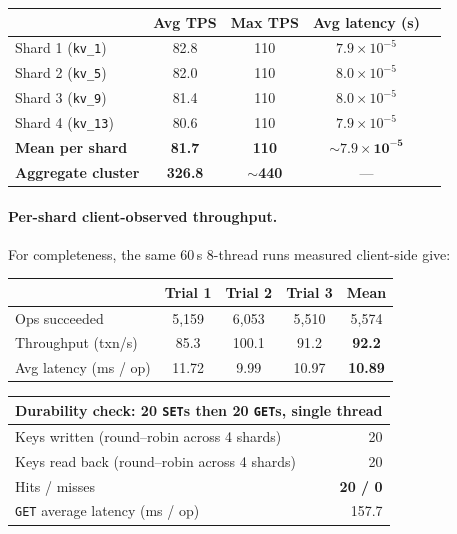 \documentclass[11pt]{article}
\begin{document}
\begin{tabular}{lcccc}
  \toprule
  & \textbf{Avg TPS} & \textbf{Max TPS} & \textbf{Avg latency (s)} \\
  \midrule
  Shard 1 (\texttt{kv\_1})  & 82.8 & 110 & $7.9 \times 10^{-5}$ \\
  Shard 2 (\texttt{kv\_5})  & 82.0 & 110 & $8.0 \times 10^{-5}$ \\
  Shard 3 (\texttt{kv\_9})  & 81.4 & 110 & $8.0 \times 10^{-5}$ \\
  Shard 4 (\texttt{kv\_13}) & 80.6 & 110 & $7.9 \times 10^{-5}$ \\
  \midrule
  \textbf{Mean per shard}   & \textbf{81.7} & \textbf{110} & $\mathbf{\sim 7.9 \times 10^{-5}}$ \\
  \textbf{Aggregate cluster}& \textbf{326.8} & \textbf{$\sim$440} & --- \\
  \bottomrule
\end{tabular}

\medskip
\paragraph{Per-shard client-observed throughput.} For
completeness, the same 60\,s 8-thread runs measured client-side give:

\begin{tabular}{lcccc}
  \toprule
   & Trial 1 & Trial 2 & Trial 3 & \textbf{Mean} \\
  \midrule
  Ops succeeded                & 5{,}159 & 6{,}053 & 5{,}510 & 5{,}574 \\
  Throughput (txn/s)           & 85.3    & 100.1   & 91.2    & \textbf{92.2} \\
  Avg latency (ms / op)        & 11.72   & 9.99    & 10.97   & \textbf{10.89} \\
  \bottomrule
\end{tabular}

\medskip
\begin{tabular}{lr}
  \toprule
  \multicolumn{2}{l}{\textbf{Durability check: 20 \texttt{SET}s then 20 \texttt{GET}s, single thread}} \\
  \midrule
  Keys written (round--robin across 4 shards)           & 20 \\
  Keys read back (round--robin across 4 shards)         & 20 \\
  Hits / misses                                         & \textbf{20 / 0} \\
  \texttt{GET} average latency (ms / op)                & 157.7 \\
  \bottomrule
\end{tabular}
\end{document}
